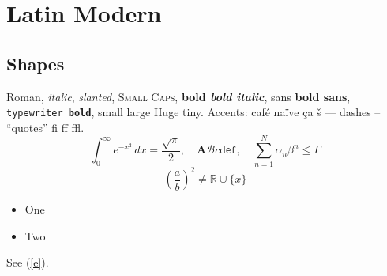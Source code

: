\documentclass{article}
\begin{document}
\section{Latin Modern}\subsection{Shapes}
Roman, \textit{italic}, \textsl{slanted}, \textsc{Small Caps}, \textbf{bold \textit{bold italic}}, \textsf{sans \textbf{bold sans}}, \texttt{typewriter \textbf{bold}}, {\small small} {\large large} {\Huge Huge} {\tiny tiny}. Accents: caf\'e na\"ive \c{c}a \v{s} --- dashes -- ``quotes'' fi ff ffl.
\[ \int_0^\infty e^{-x^2}\,dx = \frac{\sqrt{\pi}}{2}, \quad \mathbf{A}\mathcal{B}\mathit{c}\mathrm{d}\mathsf{e}\mathtt{f}, \quad \sum_{n=1}^{N} \alpha_n \beta^n \le \Gamma \]
\begin{equation} \left( \frac{a}{b} \right)^2 \neq \mathbb{R} \cup \{x\} \label{e}\end{equation}
\begin{itemize}\item One \item Two\end{itemize} See (\ref{e}).
\end{document}
